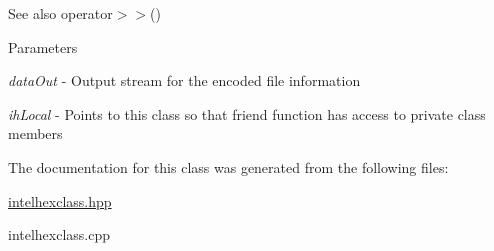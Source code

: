 \begin{DoxySeeAlso}{See also}
operator$>$$>$()
\end{DoxySeeAlso}

\begin{DoxyParams}{Parameters}
\item[{\em dataOut}]-\/ Output stream for the encoded file information \item[{\em ihLocal}]-\/ Points to this class so that friend function has access to private class members \end{DoxyParams}


The documentation for this class was generated from the following files:\begin{DoxyCompactItemize}
\item 
\hyperlink{intelhexclass_8hpp}{intelhexclass.hpp}\item 
intelhexclass.cpp\end{DoxyCompactItemize}
